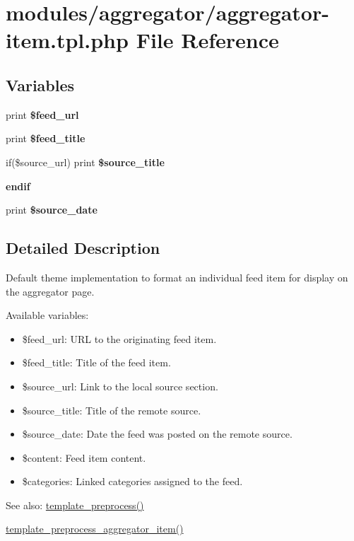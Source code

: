 \hypertarget{aggregator-item_8tpl_8php}{
\section{modules/aggregator/aggregator-item.tpl.php File Reference}
\label{aggregator-item_8tpl_8php}
}
\subsection*{Variables}
\begin{CompactItemize}
\item 
\hypertarget{aggregator-item_8tpl_8php_a9dadc8b078c51d64c9c67fe879f12c7}{
print \textbf{\$feed\_\-url}}
\label{aggregator-item_8tpl_8php_a9dadc8b078c51d64c9c67fe879f12c7}

\item 
\hypertarget{aggregator-item_8tpl_8php_6edb4dc2cf77c7c787f39d946791c26a}{
print \textbf{\$feed\_\-title}}
\label{aggregator-item_8tpl_8php_6edb4dc2cf77c7c787f39d946791c26a}

\item 
\hypertarget{aggregator-item_8tpl_8php_79ea50acfbfb933606af65e170fa3975}{
if(\$source\_\-url) print \textbf{\$source\_\-title}}
\label{aggregator-item_8tpl_8php_79ea50acfbfb933606af65e170fa3975}

\item 
\hypertarget{aggregator-item_8tpl_8php_fb799dd9a092a5f9976f8b41dc0bcd98}{
\textbf{endif}}
\label{aggregator-item_8tpl_8php_fb799dd9a092a5f9976f8b41dc0bcd98}

\item 
\hypertarget{aggregator-item_8tpl_8php_c59d3a3ff66371f6b56743eb9cc361ca}{
print \textbf{\$source\_\-date}}
\label{aggregator-item_8tpl_8php_c59d3a3ff66371f6b56743eb9cc361ca}

\end{CompactItemize}


\subsection{Detailed Description}
Default theme implementation to format an individual feed item for display on the aggregator page.

Available variables:\begin{itemize}
\item \$feed\_\-url: URL to the originating feed item.\item \$feed\_\-title: Title of the feed item.\item \$source\_\-url: Link to the local source section.\item \$source\_\-title: Title of the remote source.\item \$source\_\-date: Date the feed was posted on the remote source.\item \$content: Feed item content.\item \$categories: Linked categories assigned to the feed.\end{itemize}


\begin{Desc}
\item[See also:]\hyperlink{includes_2theme_8inc_3eeb7bcdba7ef4859f99586da264d347}{template\_\-preprocess()} 

\hyperlink{aggregator_8pages_8inc_98e977c5fd28c4e808be5786a3f9e805}{template\_\-preprocess\_\-aggregator\_\-item()} \end{Desc}
